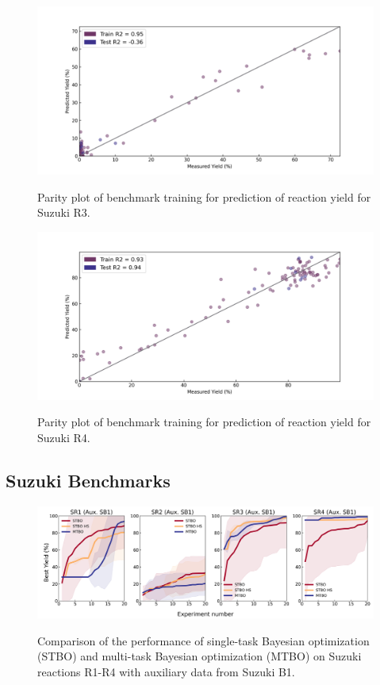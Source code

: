 \begin{figure}
\caption{Parity plot of benchmark training for prediction of reaction yield for Suzuki R3.}\includegraphics[width=1\textwidth]{gfx/Appendix/baumgartner_cn_case_3_parity_plot.png}
\label{fig:8}
\end{figure}

\begin{figure}
\caption{Parity plot of benchmark training for prediction of reaction yield for Suzuki R4.}\includegraphics[width=1\textwidth]{gfx/Appendix/reizman_suzuki_case_4_parity_plot.png}
\label{fig:9}
\end{figure}


\subsection{Suzuki Benchmarks}

\begin{figure}
\caption{ Comparison of the performance of single-task Bayesian optimization (STBO) and multi-task Bayesian optimization (MTBO) on Suzuki reactions R1-R4 with auxiliary data from Suzuki B1.}\includegraphics[width=1\textwidth]{gfx/Appendix/reizman_suzuki_baumgartner_suzuki_one_cotraining_optimization.png}
\label{fig:10}
\end{figure}

